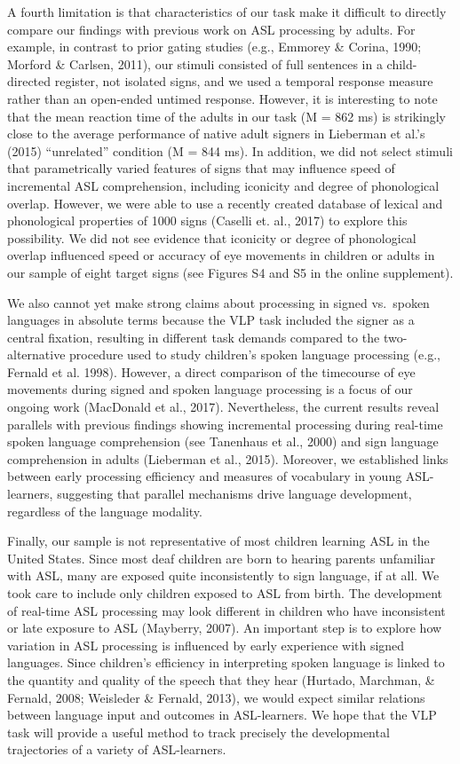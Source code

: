 \documentclass[oneside]{report}
\begin{document}
A fourth limitation is that characteristics of our task make it
difficult to directly compare our findings with previous work on ASL
processing by adults. For example, in contrast to prior gating studies
(e.g., Emmorey \& Corina, 1990; Morford \& Carlsen, 2011), our stimuli
consisted of full sentences in a child-directed register, not isolated
signs, and we used a temporal response measure rather than an open-ended
untimed response. However, it is interesting to note that the mean
reaction time of the adults in our task (M = 862 ms) is strikingly close
to the average performance of native adult signers in Lieberman et al.'s
(2015) ``unrelated'' condition (M = 844 ms). In addition, we did not
select stimuli that parametrically varied features of signs that may
influence speed of incremental ASL comprehension, including iconicity
and degree of phonological overlap. However, we were able to use a
recently created database of lexical and phonological properties of 1000
signs (Caselli et. al., 2017) to explore this possibility. We did not
see evidence that iconicity or degree of phonological overlap influenced
speed or accuracy of eye movements in children or adults in our sample
of eight target signs (see Figures S4 and S5 in the online supplement).

We also cannot yet make strong claims about processing in signed
vs.~spoken languages in absolute terms because the VLP task included the
signer as a central fixation, resulting in different task demands
compared to the two-alternative procedure used to study children's
spoken language processing (e.g., Fernald et al. 1998). However, a
direct comparison of the timecourse of eye movements during signed and
spoken language processing is a focus of our ongoing work (MacDonald et
al., 2017). Nevertheless, the current results reveal parallels with
previous findings showing incremental processing during real-time spoken
language comprehension (see Tanenhaus et al., 2000) and sign language
comprehension in adults (Lieberman et al., 2015). Moreover, we
established links between early processing efficiency and measures of
vocabulary in young ASL-learners, suggesting that parallel mechanisms
drive language development, regardless of the language modality.

Finally, our sample is not representative of most children learning ASL
in the United States. Since most deaf children are born to hearing
parents unfamiliar with ASL, many are exposed quite inconsistently to
sign language, if at all. We took care to include only children exposed
to ASL from birth. The development of real-time ASL processing may look
different in children who have inconsistent or late exposure to ASL
(Mayberry, 2007). An important step is to explore how variation in ASL
processing is influenced by early experience with signed languages.
Since children's efficiency in interpreting spoken language is linked to
the quantity and quality of the speech that they hear (Hurtado,
Marchman, \& Fernald, 2008; Weisleder \& Fernald, 2013), we would expect
similar relations between language input and outcomes in ASL-learners.
We hope that the VLP task will provide a useful method to track
precisely the developmental trajectories of a variety of ASL-learners.
\end{document}
